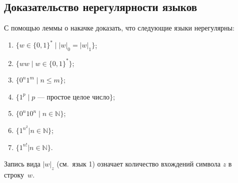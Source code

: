 \subsection*{Доказательство нерегулярности языков}

С помощью леммы о накачке доказать, что следующие языки нерегулярны:
\begin{multicols}{2}
\begin{enumerate}
  \item $\{ w \in \{0, 1\}^* \mid
  |w|_0 = |w|_1\}$;
  \item $\{w w \mid w \in \{0, 1\}^\ast \}$;
  \item $\{0^n1^m \mid n \leqslant m \}$;
  \item $\{1^p \mid \text{$p$ — простое целое число} \}$;
  \item $\{0^n10^n \mid n \in \mathbb N\}$;
  \item $\{1^{n^2} | n \in \mathbb N\}$;
  \item $\{1^{n!} | n \in \mathbb N\}$.
\end{enumerate}
\end{multicols}
\noindent Запись вида $|w|_z$  (см.~язык 1) означает количество вхождений символа $z$ в строку~$w$.

